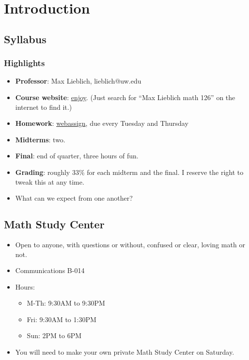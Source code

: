 \documentclass[]{article}
\begin{document}
\section{Introduction}\label{introduction}

\subsection{Syllabus}\label{syllabus}

\subsubsection{Highlights}\label{highlights}

\begin{itemize}
\itemsep1pt\parskip0pt
\item
  \textbf{Professor}: Max Lieblich, lieblich@uw.edu
\item
  \textbf{Course website}: \href{../Math126/index.php}{enjoy}. (Just
  search for ``Max Lieblich math 126'' on the internet to find it.)
\item
  \textbf{Homework}: \href{http://www.webassign.net}{webassign}, due
  every Tuesday and Thursday
\item
  \textbf{Midterms}: two.
\item
  \textbf{Final}: end of quarter, three hours of fun.
\item
  \textbf{Grading}: roughly 33\% for each midterm and the final. I
  reserve the right to tweak this at any time.
\item
  What can we expect from one another?
\end{itemize}

\subsection{Math Study Center}\label{math-study-center}

\begin{itemize}
\itemsep1pt\parskip0pt
\item
  Open to anyone, with questions or without, confused or clear, loving
  math or not.
\item
  Communications B-014
\item
  Hours:

  \begin{itemize}
  \itemsep1pt\parskip0pt
  \item
    M-Th: 9:30AM to 9:30PM
  \item
    Fri: 9:30AM to 1:30PM
  \item
    Sun: 2PM to 6PM
  \end{itemize}
\item
  You will need to make your own private Math Study Center on Saturday.
\end{itemize}
\end{document}

